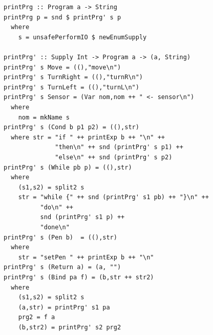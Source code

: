 \begin{small}
\begin{verbatim}
printPrg :: Program a -> String
printPrg p = snd $ printPrg' s p
  where
    s = unsafePerformIO $ newEnumSupply

printPrg' :: Supply Int -> Program a -> (a, String)
printPrg' s Move = ((),"move\n")
printPrg' s TurnRight = ((),"turnR\n")
printPrg' s TurnLeft = ((),"turnL\n")
printPrg' s Sensor = (Var nom,nom ++ " <- sensor\n")
  where
    nom = mkName s
printPrg' s (Cond b p1 p2) = ((),str)
  where str = "if " ++ printExp b ++ "\n" ++
              "then\n" ++ snd (printPrg' s p1) ++ 
              "else\n" ++ snd (printPrg' s p2)
printPrg' s (While pb p) = ((),str)
  where
    (s1,s2) = split2 s 
    str = "while {" ++ snd (printPrg' s1 pb) ++ "}\n" ++
          "do\n" ++ 
          snd (printPrg' s1 p) ++ 
          "done\n"
printPrg' s (Pen b)  = ((),str)
  where
    str = "setPen " ++ printExp b ++ "\n"
printPrg' s (Return a) = (a, "")
printPrg' s (Bind pa f) = (b,str ++ str2) 
  where
    (s1,s2) = split2 s 
    (a,str) = printPrg' s1 pa 
    prg2 = f a
    (b,str2) = printPrg' s2 prg2

\end{verbatim}
\end{small}

%
%






%
%
%


